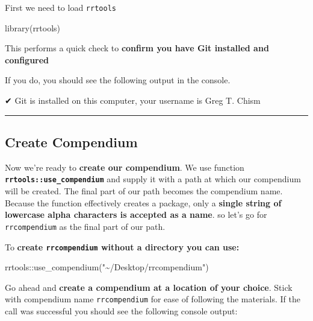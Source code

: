\documentclass[
  letterpaper,
  DIV=11,
  numbers=noendperiod]{scrreprt}
\newenvironment{Shaded}{\begin{snugshade}}{\end{snugshade}}
\newcommand{\FunctionTok}[1]{\textcolor[rgb]{0.28,0.35,0.67}{#1}}
\newcommand{\NormalTok}[1]{\textcolor[rgb]{0.00,0.23,0.31}{#1}}
\newcommand{\SpecialCharTok}[1]{\textcolor[rgb]{0.37,0.37,0.37}{#1}}
\newcommand{\StringTok}[1]{\textcolor[rgb]{0.13,0.47,0.30}{#1}}
\begin{document}
First we need to load \texttt{rrtools}

\begin{Shaded}
\begin{Highlighting}[]
\FunctionTok{library}\NormalTok{(rrtools) }
\end{Highlighting}
\end{Shaded}

This performs a quick check to \textbf{confirm you have Git installed
and configured}

If you do, you should see the following output in the console.

\begin{Shaded}
\begin{Highlighting}[]
\NormalTok{✔ Git is installed on this computer, your username is Greg T. Chism}
\end{Highlighting}
\end{Shaded}

\begin{center}\rule{0.5\linewidth}{0.5pt}\end{center}

\hypertarget{create-compendium-1}{%
\subsection{Create Compendium}\label{create-compendium-1}}

Now we're ready to \textbf{create our compendium}. We use function
\textbf{\texttt{rrtools::use\_compendium}} and supply it with a path at
which our compendium will be created. The final part of our path becomes
the compendium name. Because the function effectively creates a package,
only a \textbf{single string of lowercase alpha characters is accepted
as a name}. so let's go for \texttt{rrcompendium} as the final part of
our path.

To \textbf{create \texttt{rrcompendium} without a directory you can
use:}

\begin{Shaded}
\begin{Highlighting}[]
\NormalTok{rrtools}\SpecialCharTok{::}\FunctionTok{use\_compendium}\NormalTok{(}\StringTok{"\textasciitilde{}/Desktop/rrcompendium"}\NormalTok{)}
\end{Highlighting}
\end{Shaded}

Go ahead and \textbf{create a compendium at a location of your choice}.
Stick with compendium name \texttt{rrcompendium} for ease of following
the materials. If the call was successful you should see the following
console output:
\end{document}
